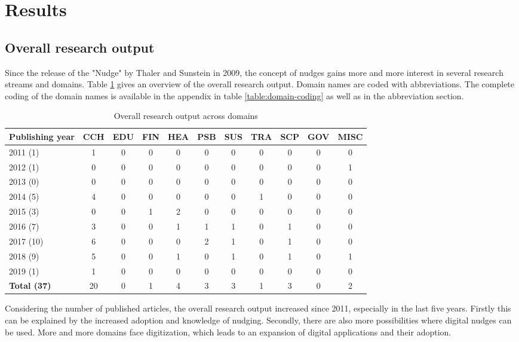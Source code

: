 \section{Results}

\subsection{Overall research output}
Since the release of the "Nudge" by Thaler and Sunstein in 2009, the concept of nudges gains more and more interest in several research streams and domains. Table \ref{table:research-output} gives an overview of the overall research output. Domain names are coded with abbreviations. The complete coding of the domain names is available in the appendix in table \ref{table:domain-coding} as well as in the abbreviation section.

\begin{table}[htbp]
\centering
\small
\begin{tabular}{|l|cccccccccc|}
\hline
\textbf{Publishing year} & \textbf{CCH} & \textbf{EDU} & \textbf{FIN} & \textbf{HEA} & \textbf{PSB} & \textbf{SUS} & \textbf{TRA} & \textbf{SCP} & \textbf{GOV} & \textbf{MISC} \\ \hline
2011 (1) & 1 & 0 & 0 & 0 & 0 & 0 & 0 & 0 & 0 &  0 \\
2012 (1) & 0 & 0 & 0 & 0 & 0 & 0 & 0 & 0 & 0 & 1 \\
2013 (0) & 0 & 0 & 0 & 0 & 0 & 0 & 0 & 0 & 0 & 0 \\
2014 (5) & 4 & 0 & 0 & 0 & 0 & 0 & 1 & 0 & 0 & 0 \\
2015 (3) & 0 & 0 & 1 & 2 & 0 & 0 & 0 & 0 & 0 & 0 \\
2016 (7) & 3 & 0 & 0 & 1 & 1 & 1 & 0 & 1 & 0 & 0 \\
2017 (10) & 6 & 0 & 0 & 0 & 2 & 1 & 0 & 1 & 0 & 0 \\
2018 (9) & 5 & 0 & 0 & 1 & 0 & 1 & 0 & 1 & 0 & 1 \\
2019 (1) & 1 & 0 & 0 & 0 & 0 & 0 & 0 & 0 & 0 & 0 \\ \hline
\textbf{Total (37)} & 20 & 0 & 1 & 4 & 3 & 3 & 1 & 3 & 0 & 2 \\ \hline
\end{tabular}
\caption{Overall research output across domains}
\label{table:research-output}
\end{table}

Considering the number of published articles, the overall research output increased since 2011, especially in the last five years. Firstly this can be explained by the increased adoption and knowledge of nudging. Secondly, there are also more possibilities where digital nudges can be used. More and more domains face digitization, which leads to an expansion of digital applications and their adoption. %
\\

